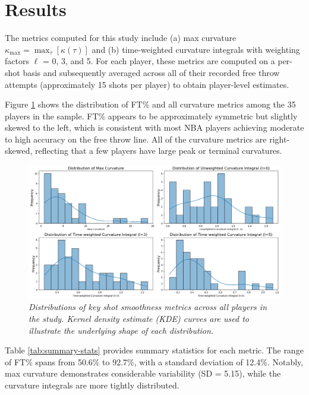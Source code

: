 \documentclass{article}
\begin{document}
\section{Results}
    
    The metrics computed for this study include (a) max curvature $\kappa_{\max} = \max_\tau[\kappa(\tau)]$ and (b) time-weighted curvature integrals with weighting factors $\ell$ = 0, 3, and 5. For each player, these metrics are computed on a per-shot basis and subsequently averaged across all of their recorded free throw attempts (approximately 15 shots per player) to obtain player-level estimates.

    Figure \ref{fig:scattered} shows the distribution of FT\% and all curvature metrics among the 35 players in the sample. FT\% appears to be approximately symmetric but slightly skewed to the left, which is consistent with most NBA players achieving moderate to high accuracy on the free throw line. All of the curvature metrics are right-skewed, reflecting that a few players have large peak or terminal curvatures.

    \begin{figure}[H]
        \centering
        \includegraphics[width=0.8\linewidth]{articles/figures/distributions.png}
        \caption{\it Distributions of key shot smoothness metrics across all players in the study. Kernel density estimate (KDE) curves are used to illustrate the underlying shape of each distribution.}
        \label{fig:scattered}
    \end{figure}
    
    Table \ref{tab:summary-stats} provides summary statistics for each metric. The range of FT\% spans from 50.6\% to 92.7\%, with a standard deviation of 12.4\%. Notably, max curvature demonstrates considerable variability (SD = 5.15), while the curvature integrals are more tightly distributed.
\end{document}
